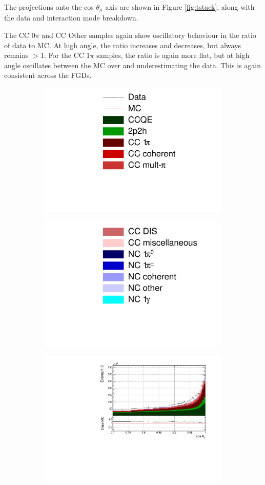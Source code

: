 The projections onto the cos $\theta_{\mu}$ axis are shown in Figure \ref{fig:tstack}, along with the data and interaction mode breakdown.

The CC 0$\pi$ and CC Other samples again show oscillatory behaviour in the ratio of data to MC. At high angle, the ratio increases and decreases, but always remains $>1$. For the CC 1$\pi$ samples,  the ratio is again more flat, but at high angle oscillates between the MC over and underestimating the data. This is again consistent across the FGDs.

\begin{figure}
\centering
\begin{subfigure}{.35\textwidth}
  \centering
  \includegraphics[width=0.7\linewidth]{figs/legend}
\end{subfigure}
\begin{subfigure}{.35\textwidth}
  \centering
  \includegraphics[width=0.7\linewidth]{figs/legend2}
\end{subfigure}
\begin{subfigure}{.32\textwidth}
  \centering
  \includegraphics[width=0.95\linewidth]{figs/FGD1_numuCC_0pi_t}

\end{subfigure}
\end{figure}

